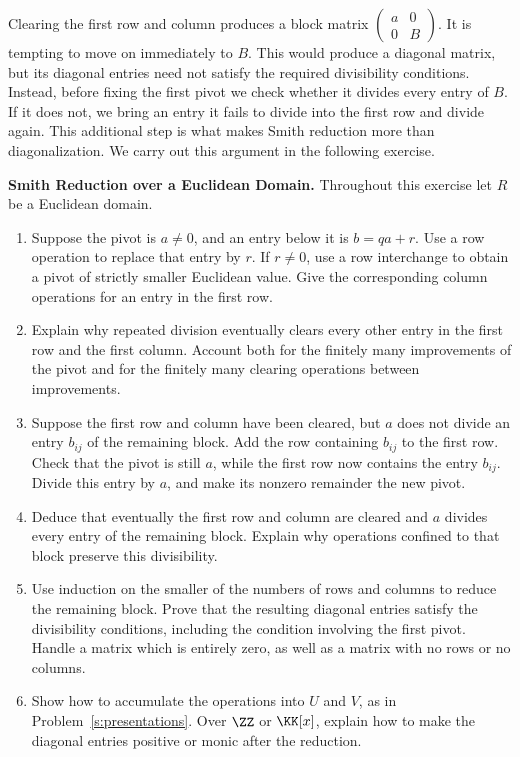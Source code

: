\documentclass[12pt,reqno]{amsart}
\begin{document}
Clearing the first row and column produces a block matrix $\left(\begin{smallmatrix}a&0\\0&B\end{smallmatrix}\right)$. It is tempting to move on immediately to $B$. This would produce a diagonal matrix, but its diagonal entries need not satisfy the required divisibility conditions. Instead, before fixing the first pivot we check whether it divides every entry of $B$. If it does not, we bring an entry it fails to divide into the first row and divide again. This additional step is what makes Smith reduction more than diagonalization. We carry out this argument in the following exercise.

\hrulefill

\begin{problems}
\item\label{s:euclidean-smith} \textbf{Smith Reduction over a Euclidean Domain.} Throughout this exercise let $R$ be a Euclidean domain.
\begin{enumerate}
\item Suppose the pivot is $a\ne0$, and an entry below it is $b=qa+r$. Use a row operation to replace that entry by $r$. If $r\ne0$, use a row interchange to obtain a pivot of strictly smaller Euclidean value. Give the corresponding column operations for an entry in the first row.
\item Explain why repeated division eventually clears every other entry in the first row and the first column. Account both for the finitely many improvements of the pivot and for the finitely many clearing operations between improvements.
\item Suppose the first row and column have been cleared, but $a$ does not divide an entry $b_{ij}$ of the remaining block. Add the row containing $b_{ij}$ to the first row. Check that the pivot is still $a$, while the first row now contains the entry $b_{ij}$. Divide this entry by $a$, and make its nonzero remainder the new pivot.
\item Deduce that eventually the first row and column are cleared and $a$ divides every entry of the remaining block. Explain why operations confined to that block preserve this divisibility.
\item Use induction on the smaller of the numbers of rows and columns to reduce the remaining block. Prove that the resulting diagonal entries satisfy the divisibility conditions, including the condition involving the first pivot. Handle a matrix which is entirely zero, as well as a matrix with no rows or no columns.
\item Show how to accumulate the operations into $U$ and $V$, as in Problem~\ref{s:presentations}. Over $\ZZ$ or $\KK[x]$, explain how to make the diagonal entries positive or monic after the reduction.
\end{enumerate}
\end{problems}
\end{document}
